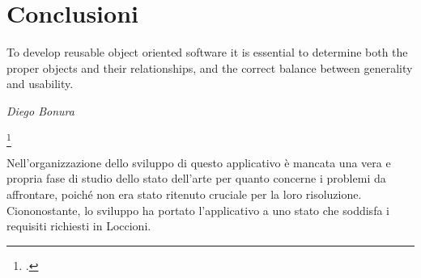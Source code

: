 






\chapter{Conclusioni}
\setlength{\epigraphwidth}{0.6\textwidth}
\epigraph{To develop reusable object oriented software it is essential to
determine both the proper objects and their relationships,
and the correct balance between generality and usability.}{\textit{Diego Bonura}\footnotemark }
\footcitetext{DBLP:conf/seke/BonuraCM02}

Nell'organizzazione dello sviluppo di questo applicativo è mancata una vera e propria fase di studio dello stato dell'arte per quanto concerne i problemi da affrontare, poiché non era stato ritenuto cruciale per la loro risoluzione.
Ciononostante, lo sviluppo ha portato l'applicativo a uno stato che soddisfa i requisiti richiesti in Loccioni. 

